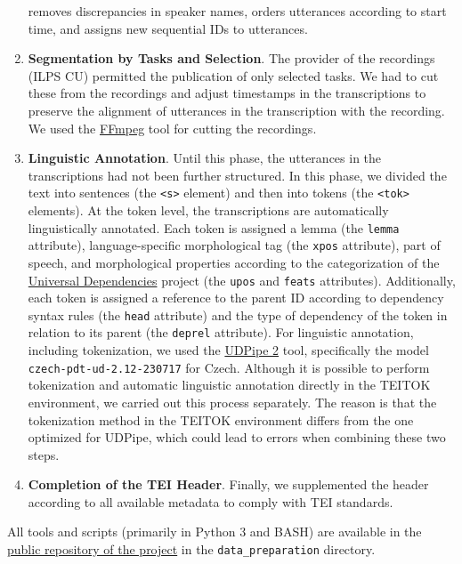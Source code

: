 \documentclass[
]{article}
\begin{document}
\begin{enumerate}
  removes discrepancies in speaker names, orders utterances according to
  start time, and assigns new sequential IDs to utterances.
\item
  \textbf{Segmentation by Tasks and Selection}. The provider of the
  recordings (ILPS CU) permitted the publication of only selected tasks.
  We had to cut these from the recordings and adjust timestamps in the
  transcriptions to preserve the alignment of utterances in the
  transcription with the recording. We used the
  \href{https://www.ffmpeg.org/}{FFmpeg} tool for cutting the
  recordings.
\item
  \textbf{Linguistic Annotation}. Until this phase, the utterances in
  the transcriptions had not been further structured. In this phase, we
  divided the text into sentences (the
  \texttt{\textless{}s\textgreater{}} element) and then into tokens (the
  \texttt{\textless{}tok\textgreater{}} elements). At the token level,
  the transcriptions are automatically linguistically annotated. Each
  token is assigned a lemma (the \texttt{lemma} attribute),
  language-specific morphological tag (the \texttt{xpos} attribute),
  part of speech, and morphological properties according to the
  categorization of the
  \href{https://universaldependencies.org/}{Universal Dependencies}
  project (the \texttt{upos} and \texttt{feats} attributes).
  Additionally, each token is assigned a reference to the parent ID
  according to dependency syntax rules (the \texttt{head} attribute) and
  the type of dependency of the token in relation to its parent (the
  \texttt{deprel} attribute). For linguistic annotation, including
  tokenization, we used the
  \href{https://ufal.mff.cuni.cz/udpipe/2}{UDPipe 2} tool, specifically
  the model \texttt{czech-pdt-ud-2.12-230717} for Czech. Although it is
  possible to perform tokenization and automatic linguistic annotation
  directly in the TEITOK environment, we carried out this process
  separately. The reason is that the tokenization method in the TEITOK
  environment differs from the one optimized for UDPipe, which could
  lead to errors when combining these two steps.
\item
  \textbf{Completion of the TEI Header}. Finally, we supplemented the
  header according to all available metadata to comply with TEI
  standards.
\end{enumerate}

All tools and scripts (primarily in Python 3 and BASH) are available in
the \href{https://github.com/ufal/evaldio}{public repository of the
project} in the \texttt{data\_preparation} directory.
\end{document}
